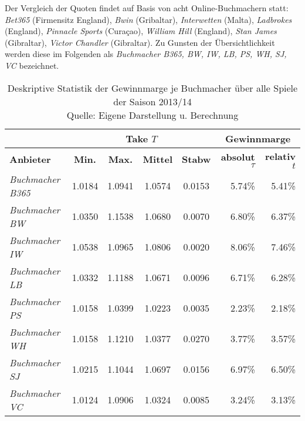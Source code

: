 Der Vergleich der Quoten findet auf Basis von acht Online-Buchmachern statt: \textit{Bet365} (Firmensitz England), \textit{Bwin} (Gribaltar), \textit{Interwetten} (Malta), \textit{Ladbrokes} (England), \textit{Pinnacle Sports} (Curaçao), \textit{William Hill} (England), \textit{Stan James} (Gibraltar), \textit{Victor Chandler} (Gibraltar). Zu Gunsten der Übersichtlichkeit werden diese im Folgenden als \textit{Buchmacher B365, BW, IW, LB, PS, WH, SJ, VC} bezeichnet.

\begin{table}
\centering
	\begin{tabular}{lccccrr}
	\toprule
	  & \multicolumn{4}{c}{\textbf{Take $ T $}} & \multicolumn{2}{c}{\textbf{Gewinnmarge}}\\
	\midrule
	\textbf{Anbieter} & \textbf{Min.} & \textbf{Max.} & \textbf{Mittel} & \textbf{Stabw} & \textbf{absolut} $ \tau $ & \textbf{relativ} $ t $\\
	\midrule
	\textit{Buchmacher B365} & 1.0184 & 1.0941 & 1.0574 & 0.0153 & 5.74\% & 5.41\% \\
	\textit{Buchmacher BW} & 1.0350 & 1.1538 & 1.0680 & 0.0070 & 6.80\% & 6.37\% \\
	\textit{Buchmacher IW} & 1.0538 & 1.0965 & 1.0806 & 0.0020 & 8.06\% & 7.46\% \\
	\textit{Buchmacher LB} & 1.0332 & 1.1188 & 1.0671 & 0.0096 & 6.71\% & 6.28\% \\
	\textit{Buchmacher PS} & 1.0158 & 1.0399 & 1.0223 & 0.0035 & 2.23\% & 2.18\% \\
	\textit{Buchmacher WH} & 1.0158 & 1.1210 & 1.0377 & 0.0270 & 3.77\% & 3.57\% \\
	\textit{Buchmacher SJ} & 1.0215 & 1.1044 & 1.0697 & 0.0156 & 6.97\% & 6.50\% \\
	\textit{Buchmacher VC} & 1.0124 & 1.0906 & 1.0324 & 0.0085 & 3.24\% & 3.13\% \\
	\toprule
	\end{tabular}
	
\caption[Gewinnmarge je Buchmacher über alle Spiele der Saison 2013/14]{Deskriptive Statistik der Gewinnmarge je Buchmacher über alle Spiele der Saison 2013/14 \\ Quelle: Eigene Darstellung u. Berechnung}
\label{tab:statistik:gewinnmarge}
\end{table}

